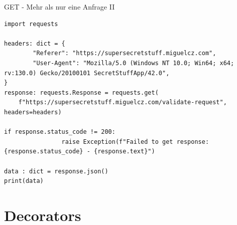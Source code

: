\documentclass[12pt, aspectratio=169, usepdftitle=false]{beamer}
\begin{document}
\begin{frame}[fragile]{GET - Mehr als nur eine Anfrage II}
	
	\begin{lstlisting}[language=pytiny]
import requests
	
headers: dict = {
		"Referer": "https://supersecretstuff.miguelcz.com",
		"User-Agent": "Mozilla/5.0 (Windows NT 10.0; Win64; x64; rv:130.0) Gecko/20100101 SecretStuffApp/42.0",
}
response: requests.Response = requests.get(
    f"https://supersecretstuff.miguelcz.com/validate-request", headers=headers)

if response.status_code != 200:
				raise Exception(f"Failed to get response: {response.status_code} - {response.text}")
	
data : dict = response.json()
print(data)

	\end{lstlisting}
\end{frame}

%	
%
%
%
%
%




\framecardfragen

\section{Decorators}
\end{document}
